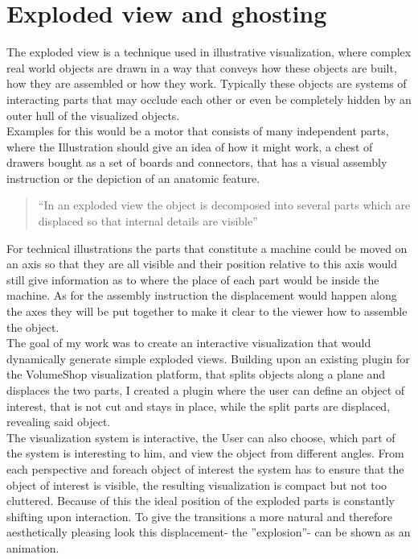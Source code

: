 \section{Exploded view and ghosting}
The exploded view is a technique used in illustrative visualization, where complex real world objects are drawn in a way that conveys how these objects are built, how they are assembled or how they work. Typically these objects are systems of interacting parts that may occlude each other or even be completely hidden by an outer hull of the visualized objects.\\
Examples for this would be a motor that consists of many independent parts, where the Illustration should give an idea of how it might work, a chest of drawers bought as a set of boards and connectors, that has a visual assembly instruction or the depiction of an anatomic feature.\\
\begin{quote}
``In an exploded view the object is decomposed into several parts which are displaced so that internal details are visible'' \cite{proc:bruckner-2006-EVV}
\end{quote}
For technical illustrations the parts that constitute a machine could be moved on an axis so that they are all visible and their position relative to this axis would still give information as to where the place of each part would be inside the machine. As for the assembly instruction the displacement would happen along the axes they will be put together to make it clear to the viewer how to assemble the object.\\
The goal of my work was to create an interactive visualization that would dynamically generate simple exploded views. Building upon an existing plugin for the VolumeShop visualization platform, that splits objects along a plane and displaces the two parts,  I created a plugin where the user can define an object of interest, that is not cut and stays in place, while the split parts are displaced, revealing said object.\\
The visualization system is interactive, the User can also choose, which part of the system is interesting to him, and view the object from different angles. From each perspective and foreach object of interest the system has to ensure that the object of interest is visible, the resulting visualization is compact but not too cluttered.  Because of this the ideal position of the exploded parts is constantly shifting upon interaction. To give the transitions a more natural and therefore aesthetically pleasing look this displacement- the ''explosion''- can be shown as an animation.\\

